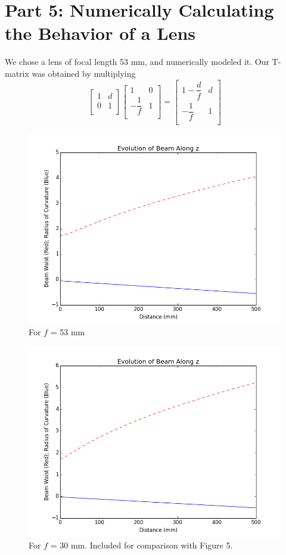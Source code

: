 \documentclass[10pt,a4paper]{article}
\begin{document}
\section*{Part 5: Numerically Calculating the Behavior of a Lens}
We chose a lens of focal length 53 mm, and numerically modeled it. Our T-matrix was obtained by multiplying
$$\begin{bmatrix}
  1 & d \\
  0 & 1 \\
\end{bmatrix}\begin{bmatrix}
  1 & 0 \\
  -\dfrac{1}{f} & 1 \\
\end{bmatrix} = \begin{bmatrix}
  1 - \dfrac{d}{f} & d \\
  -\dfrac{1}{f} & 1 \\
\end{bmatrix}$$
\begin{figure}[H]
\centering
\includegraphics[width=\textwidth]{../Analysis/figure_5.png}
\caption{For $f$ = 53 mm} 
\end{figure}
\begin{figure}[H]
\centering
\includegraphics[width=\textwidth]{../Analysis/figure_6.png} 
\caption{For $f$ = 30 mm. Included for comparison with Figure 5.}
\end{figure}
\end{document}
